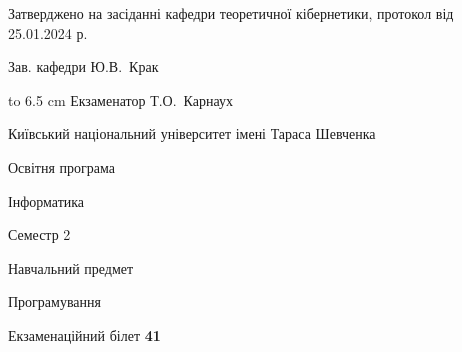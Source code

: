 \documentclass[12pt, ukrainian]{article}
\begin{document}
{\smallskip\smallskip \begin {scriptsize} Затверджено на засіданні кафедри теоретичної кібернетики, протокол   від   25.01.2024 р.\par\smallskip\smallskip\smallskip\smallskip
{\parbox {6.5 cm} {Зав. кафедри \dotfill Ю.В.~Крак}}\hspace {0.7cm} {\hbox to 6.5 cm { Екзаменатор \dotfill Т.О.~Карнаух}} \end{scriptsize}}
\newpage
{{\begin {scriptsize}\par
{ \center  Київський національний університет імені Тараса Шевченка \par}
{\parbox {5 cm}{Освітня програма \hfill}{\parbox {7 cm}{Інформатика\hfill}}\parbox {6 cm}{\hfill Семестр 2}}\par
{\parbox {5 cm} {Навчальний предмет \hfill}\parbox {7 cm}{Програмування \hfill}\parbox {6cm}{\hfill}\par}\vspace{-15pt} \end{scriptsize}}{\center Екзаменаційний білет \No \textbf { 41 }\par}}
\end{document}
